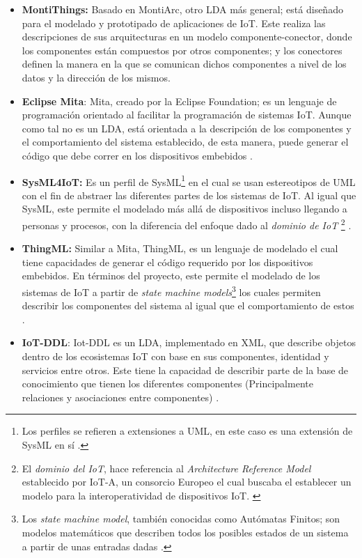 \begin{itemize}
    \item \textbf{MontiThings:} Basado en MontiArc, otro LDA más general; está diseñado para el modelado y prototipado de aplicaciones de IoT. Este realiza las descripciones de sus arquitecturas en un modelo componente-conector, donde los componentes están compuestos por otros componentes; y los conectores definen la manera en la que se comunican dichos componentes a nivel de los datos y la dirección de los mismos. \cite{MontiThings, MontiThingsRepo}
    \item \textbf{Eclipse Mita}: Mita, creado por la Eclipse Foundation; es un lenguaje de programación orientado al facilitar la programación de sistemas IoT. Aunque como tal no es un LDA, está orientada a la descripción de los componentes y el comportamiento del sistema establecido, de esta manera, puede generar el código que debe correr en los dispositivos embebidos \cite{Mita}. 
    \item \textbf{SysML4IoT:} Es un perfil de SysML\footnote{Los perfiles se refieren a extensiones a UML, en este caso es una extensión de SysML en sí \cite{Charles2007}.} en el cual se usan estereotipos de UML con el fin de abstraer las diferentes partes de los sistemas de IoT. Al igual que SysML, este permite el modelado más allá de dispositivos incluso llegando a personas y procesos, con la diferencia del enfoque dado al \textit{dominio de IoT} \footnote{El \textit{dominio del IoT}, hace referencia al \textit{Architecture Reference Model} establecido por IoT-A, un consorcio Europeo el cual buscaba el establecer un modelo para la interoperatividad de dispositivos IoT. \cite{IoTA2014}} \cite{SysML4IoT2016}.
    \item \textbf{ThingML:} Similar a Mita, ThingML, es un lenguaje de modelado el cual tiene capacidades de generar el código requerido por los dispositivos embebidos. En términos del proyecto, este permite el modelado de los sistemas de IoT a partir de \textit{state machine models}\footnote{Los \textit{state machine model}, también conocidas como Autómatas Finitos; son modelos matemáticos que describen todos los posibles estados de un sistema a partir de unas entradas dadas \cite{StateMachine2023}. } los cuales permiten describir los componentes del sistema al igual que el comportamiento de estos \cite{ThingML2016}.
    \item \textbf{IoT-DDL}: Iot-DDL es un LDA, implementado en XML, que describe objetos dentro de los ecosistemas IoT con base en sus componentes, identidad y servicios entre otros. Este tiene la capacidad de describir parte de la base de conocimiento que tienen los diferentes componentes (Principalmente relaciones y asociaciones entre componentes) \cite{Ahmed2018}.
\end{itemize}


